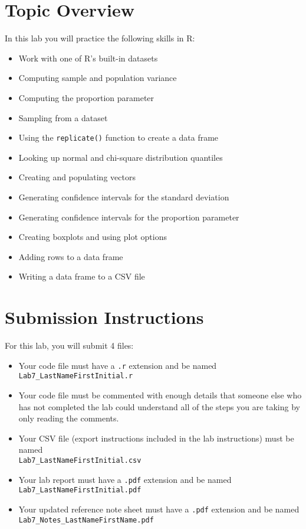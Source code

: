 \documentclass{article}
\begin{document}
\section{Topic Overview}

In this lab you will practice the following skills in R:

\begin{itemize}
    \item Work with one of R’s built-in datasets
    \item Computing sample and population variance
    \item Computing the proportion parameter
    \item Sampling from a dataset
    \item Using the \texttt{replicate()} function to create a data frame
    \item Looking up normal and chi-square distribution quantiles
    \item Creating and populating vectors
    \item Generating confidence intervals for the standard deviation
    \item Generating confidence intervals for the proportion parameter
    \item Creating boxplots and using plot options
    \item Adding rows to a data frame
    \item Writing a data frame to a CSV file
\end{itemize}

\section{Submission Instructions}

For this lab, you will submit 4 files:

\begin{itemize}
    \item Your code file must have a \texttt{.r} extension and be named \\ \texttt{Lab7\_LastNameFirstInitial.r}
    \item Your code file must be commented with enough details that someone else who has not completed the lab could understand all of the steps you are taking by only reading the comments.
    \item Your CSV file (export instructions included in the lab instructions) must be named \\ \texttt{Lab7\_LastNameFirstInitial.csv}
    \item Your lab report must have a \texttt{.pdf} extension and be named \\ \texttt{Lab7\_LastNameFirstInitial.pdf}
    \item Your updated reference note sheet must have a \texttt{.pdf} extension and be named \\ \texttt{Lab7\_Notes\_LastNameFirstName.pdf}
\end{itemize}
\end{document}
